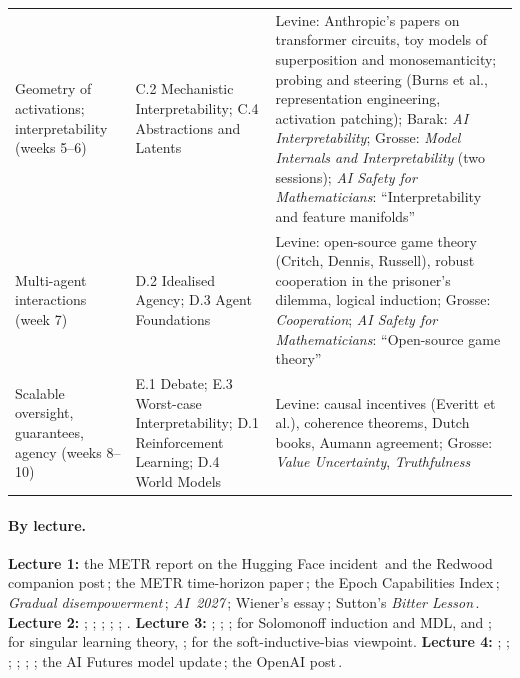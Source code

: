 \begin{tabular}{@{}>{\raggedright\arraybackslash}p{27mm}>{\raggedright\arraybackslash}p{37mm}>{\raggedright\arraybackslash}p{55mm}@{}}
Geometry of activations; interpretability (weeks 5--6) & C.2 Mechanistic Interpretability; C.4 Abstractions and Latents & Levine: Anthropic's papers on transformer circuits, toy models of superposition and monosemanticity; probing and steering (Burns et al., representation engineering, activation patching); Barak: \emph{AI Interpretability}; Grosse: \emph{Model Internals and Interpretability} (two sessions); \emph{AI Safety for Mathematicians}: ``Interpretability and feature manifolds''\\
Multi-agent interactions (week 7) & D.2 Idealised Agency; D.3 Agent Foundations & Levine: open-source game theory (Critch, Dennis, Russell), robust cooperation in the prisoner's dilemma, logical induction; Grosse: \emph{Cooperation}; \emph{AI Safety for Mathematicians}: ``Open-source game theory''\\
Scalable oversight, guarantees, agency (weeks 8--10) & E.1 Debate; E.3 Worst-case Interpretability; D.1 Reinforcement Learning; D.4 World Models & Levine: causal incentives (Everitt et al.), coherence theorems, Dutch books, Aumann agreement; Grosse: \emph{Value Uncertainty}, \emph{Truthfulness}\\
\bottomrule
\end{tabular}
\normalsize

\paragraph{By lecture\dagmark.} \textbf{Lecture 1:} the METR report on the Hugging Face incident\,\citep{metr2026} and the Redwood companion post\,\citep{redwood2026}; the METR time-horizon paper\,\citep{kwa2025}; the Epoch Capabilities Index\,\citep{epoch2025eci}; \emph{Gradual disempowerment}\,\citep{kulveit2025}; \emph{AI~2027}\,\citep{aifutures2025}; Wiener's essay\,\citep{wiener1960}; Sutton's \emph{Bitter Lesson}\,\citep{sutton2019}.
\textbf{Lecture 2:} \citet{kaplan2020}; \citet{hoffmann2022}; \citet{jacot2018}; \citet{chizat2019}; \citet{bahri2024}; \citet{bordelon2025}.
\textbf{Lecture 3:} \citet{zhang2017}; \citet{sharma2022}; \citet{fortmannroe2012}; for Solomonoff induction and MDL, \citet{li2019} and \citet{grunwald2007}; for singular learning theory, \citet{watanabe2009,watanabe2018}; \citet{wilson2025} for the soft-inductive-bias viewpoint.
\textbf{Lecture 4:} \citet{jones1995}; \citet{bloom2020}; \citet{ho2024}; \citet{besiroglu2024}; \citet{whitfill2025}; \citet{davidson2025}; the AI Futures model update\,\citep{aifutures2025dec}; the OpenAI post\,\citep{openai2026ra}.

